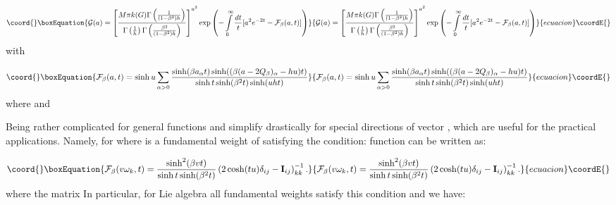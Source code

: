 \documentclass[a4paper,12pt]{article}
\begin{document}
\begin{equation}\coord{}\boxEquation{
{\cal G}(a)=\left[ \frac{M\pi k(G)\Gamma \left( \frac 1{(1-\beta ^2)h}
\right) }{\Gamma \left( \frac 1h\right) \Gamma \left( \frac{\beta ^2}
{(1-\beta ^2)h}\right) }\right] ^{a^2}\exp \left( -\int\limits_0^\infty 
\frac{dt}t[a^2e^{-2t}-
{\cal F}_\beta (a,t)]\right)  \label{ivev}
}{
{\cal G}(a)=\left[ \frac{M\pi k(G)\Gamma \left( \frac 1{(1-\beta ^2)h}
\right) }{\Gamma \left( \frac 1h\right) \Gamma \left( \frac{\beta ^2}
{(1-\beta ^2)h}\right) }\right] ^{a^2}\exp \left( -\int\limits_0^\infty 
\frac{dt}t[a^2e^{-2t}-
{\cal F}_\beta (a,t)]\right)  }{ecuacion}\coordE{}\end{equation}
with

\begin{equation}\coord{}\boxEquation{
{\cal F}_\beta (a,t)=\sinh u\sum_{\alpha >0}\frac{\sinh (\beta a_\alpha
t)\sinh ((\beta (a-2Q_\beta )_\alpha -hu)t)}{\sinh t\sinh (\beta ^2t)\sinh
(uht)}  \label{ifb}
}{
{\cal F}_\beta (a,t)=\sinh u\sum_{\alpha >0}\frac{\sinh (\beta a_\alpha
t)\sinh ((\beta (a-2Q_\beta )_\alpha -hu)t)}{\sinh t\sinh (\beta ^2t)\sinh
(uht)}  }{ecuacion}\coordE{}\end{equation}
where \coordHE{} and \coordHE{}

Being rather complicated for general \coordHE{} functions \coordHE{}
and \coordHE{} simplify drastically for special directions of vector \coordHE{},
which are useful for the practical applications. Namely, for \coordHE{}
where \coordHE{} is a fundamental weight of \coordHE{} satisfying the condition: 
\coordHE{} function \coordHE{} can be written as:

\begin{equation}\coord{}\boxEquation{
{\cal F}_\beta (v\omega _k,t)=\frac{\sinh ^2(\beta vt)}{\sinh t\sinh (\beta
^2t)}\left( 2\cosh (tu)\delta _{ij}-{\bf I}_{ij}\right) _{kk}^{-1}.
\label{inc}
}{
{\cal F}_\beta (v\omega _k,t)=\frac{\sinh ^2(\beta vt)}{\sinh t\sinh (\beta
^2t)}\left( 2\cosh (tu)\delta _{ij}-{\bf I}_{ij}\right) _{kk}^{-1}.
}{ecuacion}\coordE{}\end{equation}
where the matrix \coordHE{} In particular,
for Lie algebra \coordHE{} all fundamental weights satisfy this condition and
we have:
\end{document}
